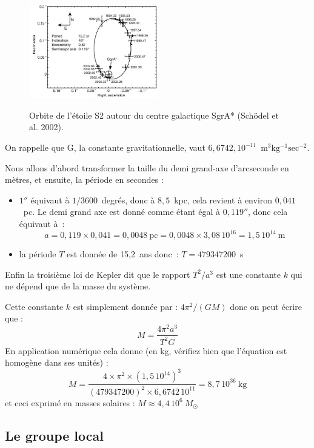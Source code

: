 \documentclass[a4paper,10pt]{report}
\newcommand{\e}[1]{\ensuremath{\, 10^{#1}}}
\renewcommand{\u}[1]{\ensuremath{\mathrm{#1}}} %
\begin{document}
\begin{figure}[htp]
  \centering
  \includegraphics[width=0.5\textwidth]{nature01121-f2_2}
  \label{centregalac}
  \caption{Orbite de l'étoile S2 autour du centre galactique SgrA*
    (Schödel et al. 2002).}
\end{figure}

\begin{Answer}
  On rappelle que G, la constante gravitationnelle, vaut
  $6,6742,10^{-11}$~\u{m^3kg^{-1}sec^{-2}}.

  Nous allons d'abord transformer la taille du demi grand-axe
  d'arcseconde en mètres, et ensuite, la période en secondes :
  \begin{itemize}
  \item $1''$ équivaut à $1/3600$~degrés, donc à $8,5$~kpc, cela
    revient à environ $0,041$~pc. Le demi grand axe est donné comme
    étant égal à $0,119''$, donc cela équivaut à~:
    $$
    a = 0,119 \times 0,041 = 0,0048~\u{pc} = 0,0048\times 3,08\e{16} =
    1,5\e{14}~\u{m}
    $$

  \item la période $T$ est donnée de 15,2~ans donc~: $T=479347200$~s
  \end{itemize}

  Enfin la troisième loi de Kepler dit que le rapport $T^2/a^3$ est une
  constante $k$ qui ne dépend que de la masse du système.

  Cette constante $k$ est simplement donnée par : $4\pi^2/(GM)$ donc on
  peut écrire que :
  $$
  M = \frac{4\pi^2 a^3}{T^2 G}
  $$
  En application numérique cela donne (en kg, vérifiez bien que
  l'équation est homogène dans ses unités) :
  $$
  M = \frac{ 4 \times \pi^2 \times (1,5\e{14})^3 } { (479 347 200)^2
    \times 6,6742\e{11} } = 8,7\e{36}~\u{kg}
  $$
  et ceci exprimé en masses solaires : $M \approx 4,4\e{6}~M_{\odot}$
\end{Answer}

\subsection{Le groupe local}
\end{document}
